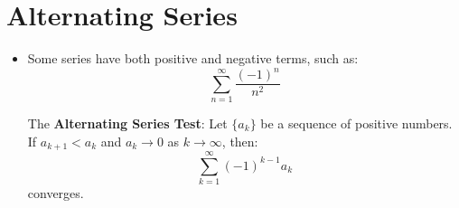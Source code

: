 \section{Alternating Series}
\begin{itemize}
    \item Some series have both positive and negative terms, such as:
    \begin{equation}
        \sum_{n=1}^\infty \frac{(-1)^n}{n^2}
    \end{equation}
    \begin{theorem}
        The \textbf{Alternating Series Test}: Let $\{a_k\}$ be a sequence of positive numbers. If $a_{k+1}<a_k$ and $a_k \to 0$ as $k \to \infty$, then:
        \begin{equation}
            \sum_{k=1}^\infty (-1)^{k-1} a_k
        \end{equation}
        converges.
    \end{theorem}
\end{itemize}